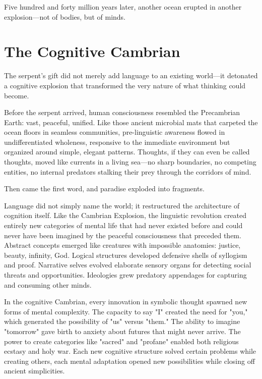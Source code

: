 Five hundred and forty million years later, another ocean erupted in another explosion—not of bodies, but of minds.

\section{The Cognitive Cambrian}

The serpent's gift did not merely add language to an existing world—it detonated a cognitive explosion that transformed the very nature of what thinking could become.

Before the serpent arrived, human consciousness resembled the Precambrian Earth: vast, peaceful, unified. Like those ancient microbial mats that carpeted the ocean floors in seamless communities, pre-linguistic awareness flowed in undifferentiated wholeness, responsive to the immediate environment but organized around simple, elegant patterns. Thoughts, if they can even be called thoughts, moved like currents in a living sea—no sharp boundaries, no competing entities, no internal predators stalking their prey through the corridors of mind.

Then came the first word, and paradise exploded into fragments.

Language did not simply name the world; it restructured the architecture of cognition itself. Like the Cambrian Explosion, the linguistic revolution created entirely new categories of mental life that had never existed before and could never have been imagined by the peaceful consciousness that preceded them. Abstract concepts emerged like creatures with impossible anatomies: justice, beauty, infinity, God. Logical structures developed defensive shells of syllogism and proof. Narrative selves evolved elaborate sensory organs for detecting social threats and opportunities. Ideologies grew predatory appendages for capturing and consuming other minds.

In the cognitive Cambrian, every innovation in symbolic thought spawned new forms of mental complexity. The capacity to say "I" created the need for "you," which generated the possibility of "us" versus "them." The ability to imagine "tomorrow" gave birth to anxiety about futures that might never arrive. The power to create categories like "sacred" and "profane" enabled both religious ecstasy and holy war. Each new cognitive structure solved certain problems while creating others, each mental adaptation opened new possibilities while closing off ancient simplicities.

